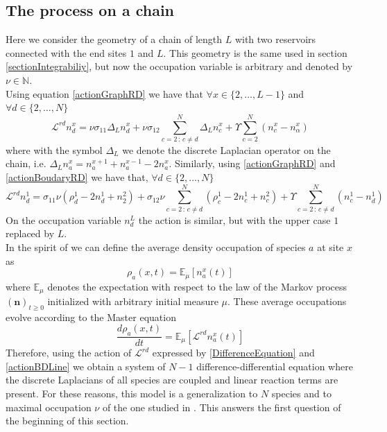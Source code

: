\documentclass[10pt]{article}
\numberwithin{equation}{section}
\numberwithin{equation}{subsection}
\begin{document}
\subsection{The process on a chain}
Here we consider the geometry of a chain of length $L$ with two reservoirs connected with the end sites $1$ and $L$. This geometry is the same used in section \ref{sectionIntegrabiliy}, but now the occupation variable is arbitrary and denoted by $\nu\in \mathbb{N}$.\\
Using equation \eqref{actionGraphRD} we have that $\forall x\in \{2,\ldots,L-1\}$ and $\forall d\in\{2,\ldots,N\}$
\begin{equation}\label{DifferenceEquation}
	\mathcal{L}^{rd}n_{d}^{x}=\nu\sigma_{11}\Delta_{L}n_{d}^{x}+\nu\sigma_{12}\sum_{c=2\,:\,c\neq d}^{N}\Delta_{L}n_{c}^{x}+\Upsilon\sum_{c=2}^{N}(n_{c}^{x}-n_{\alpha}^{x})
\end{equation}
where with the symbol $\Delta_{L}$ we denote the discrete Laplacian operator on the chain, i.e. $\Delta_{L}n_{a}^{x}=n_{a}^{x+1}+n_{a}^{x-1}-2n_{a}^{x}$.
Similarly, using \eqref{actionGraphRD}  and \eqref{actionBoudaryRD} we have that, $\forall d\in \{2,\ldots,N\}$ 
\begin{equation}\label{actionBDLine}
	\mathcal{L}^{rd}n_{d}^{1}=\sigma_{11}\nu \left(\rho_{d}^{1}-2n_{d}^{1}+n_{2}^{2}\right)+\sigma_{12}\nu\sum_{c=2\,:\,c\neq d}^{N}\left(\rho_{c}^{1}-2n_{c}^{1}+n_{c}^{2}\right)+\Upsilon\sum_{c=2\,:\,c\neq d}^{N}\left(n_{c}^{1}-n_{d}^{1}\right)
\end{equation}
On the occupation variable $n_{d}^{L}$ the action is similar, but with the upper case $1$ replaced by $L$.\\ In the spirit of \cite{casini2022uphill} we can define the average density occupation of species $a$ at site $x$ as
\begin{equation}
	\rho_{a}(x,t)=\mathbb{E}_{\mu}\left[n_{a}^{x}(t)\right]
\end{equation}
where $\mathbb{E}_{\mu}$ denotes the expectation with respect to the law of the Markov process $(\bm{n})_{t\geq 0}$ initialized with arbitrary initial measure $\mu$. These average occupations evolve according to the Master equation
\begin{equation}
	\frac{d \rho_{a}(x,t)}{dt}=\mathbb{E}_{\mu}\left[\mathcal{L}^{rd}n_{a}^{x}(t)\right]
\end{equation} 
Therefore, using the action of $\mathcal{L}^{rd}$ expressed by \eqref{DifferenceEquation} and \eqref{actionBDLine} we obtain a system of $N-1$ difference-differential equation where the discrete Laplacians of all species are coupled and linear reaction terms are present. For these reasons, this model is a generalization to $N$ species and to maximal occupation $\nu$ of the one studied in \cite{casini2022uphill}. This answers the first question of the beginning of this section. 
\end{document}
